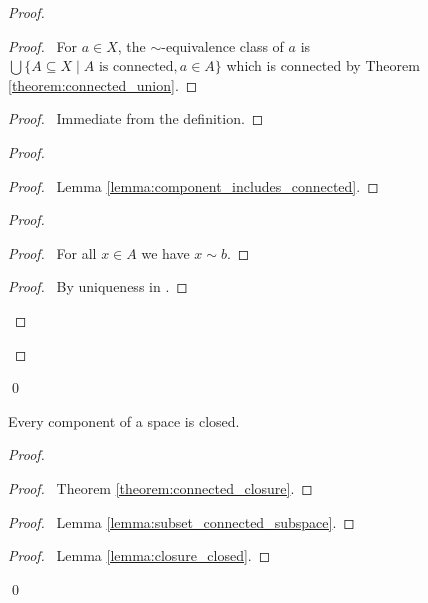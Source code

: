 \begin{proof}
    \pf
    \begin{proof}
        \pf\ For $a \in X$, the $\sim$-equivalence class of $a$ is
        $\bigcup \{ A \subseteq X \mid A \text{ is connected}, a \in A \}$
        which is connected by Theorem \ref{theorem:connected_union}.
    \end{proof}
    \begin{proof}
        \pf\ Immediate from the definition.
    \end{proof}
    \begin{proof}
        \begin{proof}
            \pf\ Lemma \ref{lemma:component_includes_connected}.
        \end{proof}
        \begin{proof}
            \begin{proof}
                \pf\ For all $x \in A$ we have $x \sim b$.
            \end{proof}
            \begin{proof}
                \pf\ By uniqueness in .
            \end{proof}
        \end{proof}
    \end{proof}
    \qed
\end{proof}

\begin{proposition}
    Every component of a space is closed.
\end{proposition}

\begin{proof}
    \pf
    \begin{proof}
        \pf\ Theorem \ref{theorem:connected_closure}.
    \end{proof}
    \begin{proof}
        \pf\ Lemma \ref{lemma:subset_connected_subspace}.
    \end{proof}
    \begin{proof}
        \pf\ Lemma \ref{lemma:closure_closed}.
    \end{proof}
    \qed
\end{proof}

